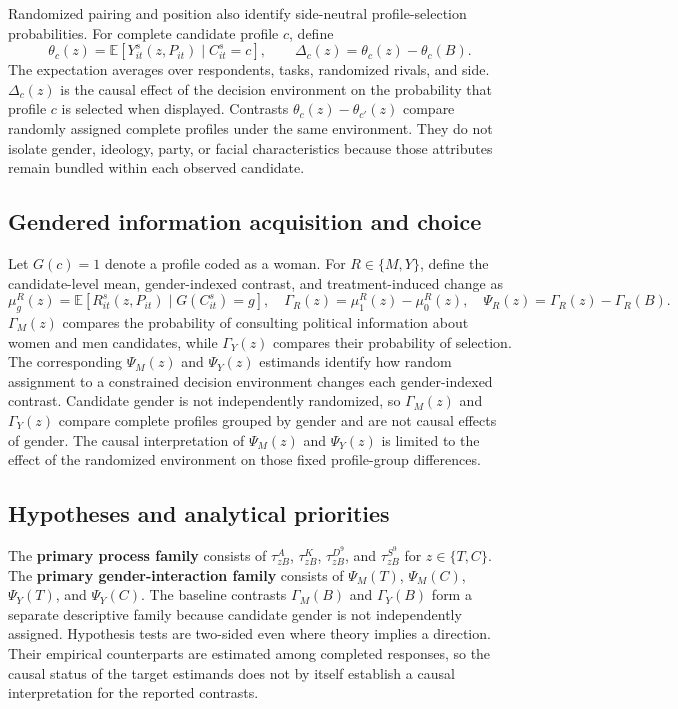 \documentclass[11pt]{article}\usepackage[]{graphicx}\usepackage[]{xcolor}
\newcommand{\E}{\mathbb{E}}
\begin{document}
Randomized pairing and position also identify side-neutral profile-selection probabilities. For complete candidate profile $c$, define
\[
\theta_c(z)=\E\!\left[Y^s_{it}(z,P_{it})\mid C^s_{it}=c\right],\qquad
\Delta_c(z)=\theta_c(z)-\theta_c(B).
\]
The expectation averages over respondents, tasks, randomized rivals, and side. $\Delta_c(z)$ is the causal effect of the decision environment on the probability that profile $c$ is selected when displayed. Contrasts $\theta_c(z)-\theta_{c'}(z)$ compare randomly assigned complete profiles under the same environment. They do not isolate gender, ideology, party, or facial characteristics because those attributes remain bundled within each observed candidate.

\subsection{Gendered information acquisition and choice}

Let $G(c)=1$ denote a profile coded as a woman. For $R\in\{M,Y\}$, define the candidate-level mean, gender-indexed contrast, and treatment-induced change as
\[
\mu^R_g(z)=\E\!\left[R^s_{it}(z,P_{it})\mid G(C^s_{it})=g\right],\quad
\Gamma_R(z)=\mu^R_1(z)-\mu^R_0(z),\quad
\Psi_R(z)=\Gamma_R(z)-\Gamma_R(B).
\]
$\Gamma_M(z)$ compares the probability of consulting political information about women and men candidates, while $\Gamma_Y(z)$ compares their probability of selection. The corresponding $\Psi_M(z)$ and $\Psi_Y(z)$ estimands identify how random assignment to a constrained decision environment changes each gender-indexed contrast. Candidate gender is not independently randomized, so $\Gamma_M(z)$ and $\Gamma_Y(z)$ compare complete profiles grouped by gender and are not causal effects of gender. The causal interpretation of $\Psi_M(z)$ and $\Psi_Y(z)$ is limited to the effect of the randomized environment on those fixed profile-group differences.

\subsection{Hypotheses and analytical priorities}

The \textbf{primary process family} consists of $\tau^A_{zB}$, $\tau^K_{zB}$, $\tau^{D^{9}}_{zB}$, and $\tau^{S^{9}}_{zB}$ for $z\in\{T,C\}$. The \textbf{primary gender-interaction family} consists of $\Psi_M(T)$, $\Psi_M(C)$, $\Psi_Y(T)$, and $\Psi_Y(C)$. The baseline contrasts $\Gamma_M(B)$ and $\Gamma_Y(B)$ form a separate descriptive family because candidate gender is not independently assigned. Hypothesis tests are two-sided even where theory implies a direction. Their empirical counterparts are estimated among completed responses, so the causal status of the target estimands does not by itself establish a causal interpretation for the reported contrasts.
\end{document}

